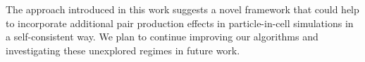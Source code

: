 The approach introduced in this work suggests a novel framework that could help to incorporate additional pair production effects in particle-in-cell simulations in a self-consistent way. We plan to continue improving our algorithms and investigating these unexplored regimes in future work.

